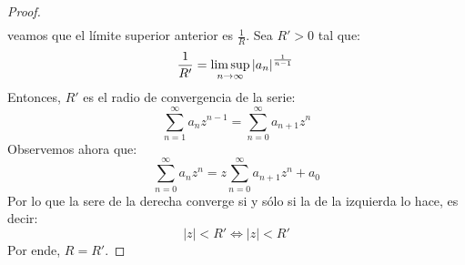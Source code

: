 \documentclass[12pt]{report}
\newcounter{it}
\theoremstyle{largebreak}
\newcommand\abs[1]{\ensuremath{\left|#1\right|}}
\begin{document}
\begin{proof}
\begin{equation*}
\begin{split}
            \end{split}
        \end{equation*}
        veamos que el límite superior anterior es $\frac{1}{R}$. Sea $R'>0$ tal que:
        \begin{equation*}
            \frac{1}{R'}=\limsup_{ n\rightarrow\infty}\abs{a_n}^{\frac{1}{n-1}}\\
        \end{equation*}
        Entonces, $R'$ es el radio de convergencia de la serie:
        \begin{equation*}
            \sum_{ n=1}^\infty a_nz^{ n-1}=\sum_{ n=0}^\infty a_{n+1}z^{n}
        \end{equation*}
        Observemos ahora que:
        \begin{equation*}
            \sum_{ n=0}^\infty a_nz^n=z\sum_{ n=0}^\infty a_{ n+1}z^n+a_0
        \end{equation*}
        Por lo que la sere de la derecha converge si y sólo si la de la izquierda lo hace, es decir:
        \begin{equation*}
            \abs{z}<R'\iff \abs{z}<R'
        \end{equation*}
        Por ende, $R=R'$.


\end{proof}
\end{document}
